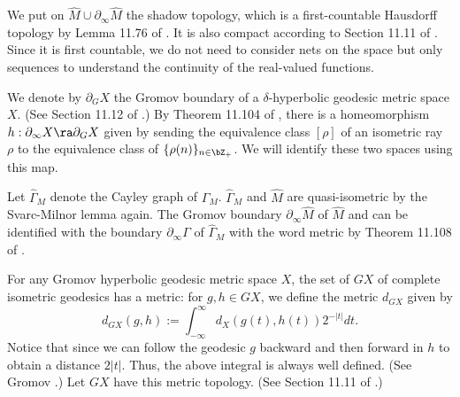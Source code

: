  
 


 	We put on $\hat M \cup \partial_\infty \hat M$ the 
 shadow topology, which is a first-countable Hausdorff topology
 by Lemma 11.76 of \cite{DK2018}. It is also compact according to Section 11.11 of \cite{DK2018}. 
 Since it is first countable, 
 we do not need to consider nets on the space but only sequences
 to understand the continuity of the real-valued functions. 

We denote by $\partial_G X$ the Gromov boundary of 
a $\delta$-hyperbolic geodesic metric space $X$. (See Section 11.12 of \cite{DK2018}.)
 By Theorem 11.104 of \cite{DK2018}, 
 there is a homeomorphism $h: \partial_\infty X
 \ra \partial_G X$ given 
 by sending the equivalence class $[\rho]$ of an isometric ray $\rho$
 to the equivalence class of $\{\rho(n)\}_{n \in \bZ_+}$. 
 We will identify these two spaces using this map. 

Let $\hat{\Gamma}_M$ denote the Cayley graph of $\Gamma_M$. 
$\hat{\Gamma}_M$ and $\hat M$ are quasi-isometric by 
the Svarc-Milnor lemma again. 
The Gromov boundary $\partial_\infty \hat M$ of $\hat M$ and 
can be identified 
with the boundary $\partial_\infty \Gamma$ of
$\hat{\Gamma}_M$ with the word metric
by Theorem 11.108 of \cite{DK2018}. 

For any Gromov hyperbolic geodesic metric space $X$, 
the set of $GX$ of complete isometric geodesics has a metric: 
for $g, h \in GX$, we 
define the metric $d_{GX}$ given by 
\begin{equation}\label{eqn:dGX} 
 d_{GX}(g, h) := \int^\infty_{-\infty} d_X(g(t), h(t)) 2^{-|t|} dt.    
\end{equation}
Notice that 
since we can follow the geodesic $g$ backward and 
then forward in $h$ to obtain a distance $2|t|$. Thus, the above integral is always 
well defined. 
(See Gromov \cite{Gromov87}.)
%
%
Let $GX$ have this metric topology. 
(See Section 11.11 of \cite{DK2018}.)


